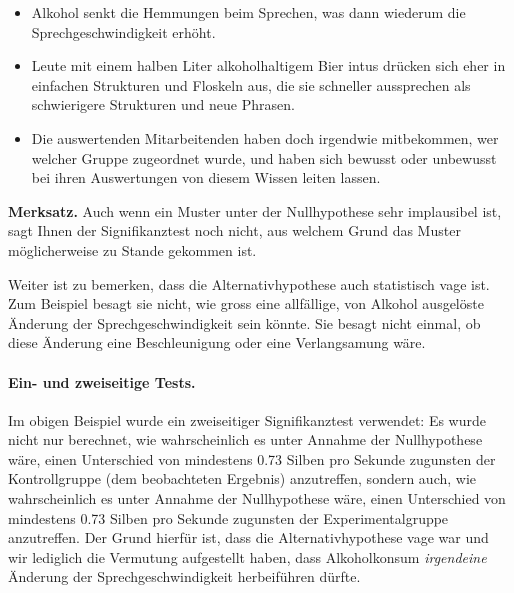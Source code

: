\documentclass[oneside, 10pt]{book}\usepackage[]{graphicx}\usepackage[]{xcolor}
\begin{document}
\begin{itemize}
 \item Alkohol senkt die Hemmungen beim Sprechen,
 was dann wiederum die Sprechgeschwindigkeit erhöht.

 \item Leute mit einem halben Liter alkoholhaltigem
 Bier intus drücken sich eher in einfachen Strukturen
 und Floskeln aus, die sie schneller aussprechen
 als schwierigere Strukturen und neue Phrasen.

 \item Die auswertenden Mitarbeitenden haben doch
 irgendwie mitbekommen, wer welcher Gruppe zugeordnet
 wurde, und haben sich bewusst oder unbewusst bei ihren
 Auswertungen von diesem Wissen leiten lassen.
\end{itemize}

\medskip

\begin{framed}
\noindent \textbf{Merksatz.} Auch wenn ein Muster
unter der Nullhypothese sehr implausibel ist,
sagt Ihnen der Signifikanztest noch nicht,
aus welchem Grund das Muster möglicherweise
zu Stande gekommen ist.
\end{framed}

\medskip

Weiter ist zu bemerken, dass die Alternativhypothese
auch statistisch vage ist. Zum Beispiel besagt sie
nicht, wie gross eine allfällige, von Alkohol ausgelöste
Änderung der Sprechgeschwindigkeit sein könnte. Sie
besagt nicht einmal, ob diese Änderung eine Beschleunigung
oder eine Verlangsamung wäre.

\paragraph{Ein- und zweiseitige Tests.}
Im obigen Beispiel wurde ein zweiseitiger Signifikanztest verwendet:
Es wurde nicht nur berechnet, wie wahrscheinlich es unter Annahme der Nullhypothese
wäre, einen Unterschied von mindestens 0.73 Silben pro Sekunde zugunsten der Kontrollgruppe
(dem beobachteten Ergebnis) anzutreffen, sondern auch, wie wahrscheinlich es unter
Annahme der Nullhypothese wäre, einen Unterschied von mindestens 0.73 Silben pro Sekunde
zugunsten der Experimentalgruppe anzutreffen. Der Grund hierfür ist, dass die Alternativhypothese
vage war und wir lediglich die Vermutung aufgestellt haben, dass Alkoholkonsum \emph{irgendeine}
Änderung der Sprechgeschwindigkeit herbeiführen dürfte.
\end{document}
